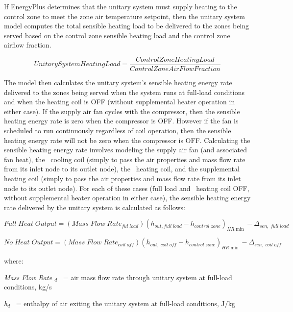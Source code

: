 If EnergyPlus determines that the unitary system must supply heating to the control zone to meet the zone air temperature setpoint, then the unitary system model computes the total sensible heating load to be delivered to the zones being served based on the control zone sensible heating load and the control zone airflow fraction.

\begin{equation}
UnitarySystemHeatingLoad = \frac{{ControlZoneHeatingLoad}}{{ControlZoneAirFlowFraction}}
\end{equation}

The model then calculates the unitary system's sensible heating energy rate delivered to the zones being served when the system runs at full-load conditions and when the heating coil is OFF (without supplemental heater operation in either case). If the supply air fan cycles with the compressor, then the sensible heating energy rate is zero when the compressor is OFF. However if the fan is scheduled to run continuously regardless of coil operation, then the sensible heating energy rate will not be zero when the compressor is OFF. Calculating the sensible heating energy rate involves modeling the supply air fan (and associated fan heat), the~ cooling coil (simply to pass the air properties and mass flow rate from its inlet node to its outlet node), the~ heating coil, and the supplemental heating coil (simply to pass the air properties and mass flow rate from its inlet node to its outlet node). For each of these cases (full load and~ heating coil OFF, without supplemental heater operation in either case), the sensible heating energy rate delivered by the unitary system is calculated as follows:

\begin{equation}
Full\;Heat\;Output = (Mass\;Flow\;Rat{e_{ful\;load}}){({h_{out,full\;load}} - {h_{control\;zone}})_{HR\min }} - {\Delta_{sen,\;full\;load}}
\end{equation}

\begin{equation}
No\;Heat\;Output = (Mass\;Flow\;Rat{e_{coil\;off}}){({h_{out,\;coil\;off}} - {h_{control\;zone}})_{HR\min }} - {\Delta_{sen,\;coil\;off}}
\end{equation}

where:

\emph{Mass Flow Rate \(_{d}\)}~ = air mass flow rate through unitary system at full-load conditions, kg/s

\emph{h\(_{d}\)}~ = enthalpy of air exiting the unitary system at full-load conditions, J/kg

